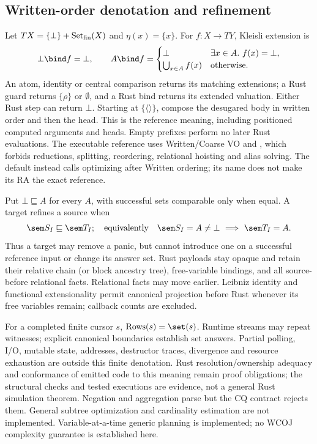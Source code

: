 \subsection{Written-order denotation and refinement}
Let $T X=\{\bot\}+\operatorname{Set}_{\rm fin}(X)$ and
$\eta(x)=\{x\}$. For $f:X\to T Y$, Kleisli extension is
\[
 \bot\bind f=\bot,\qquad
 A\bind f=\begin{cases}
 \bot&\exists x\in A.\ f(x)=\bot,\\
 \bigcup_{x\in A}f(x)&\text{otherwise}.
 \end{cases}
\]
An atom, identity or central comparison returns its matching extensions;
a Rust guard returns $\{\rho\}$ or $\emptyset$, and a Rust bind returns its
extended valuation. Either Rust step can return $\bot$. Starting at
$\{\langle\rangle\}$, compose the desugared body in written order and then
the head. This is the reference meaning, including positioned computed
arguments and heads. Empty prefixes perform no later Rust evaluations.
The executable reference uses Written/Coarse VO and
, which forbids reductions, splitting,
reordering, relational hoisting and alias solving. The default
 instead calls optimizing  after Written
ordering; its name does not make its RA the exact reference.

Put $\bot\sqsubseteq A$ for every $A$, with successful sets comparable only
when equal. A target refines a source when
\[
 \sem S_I\sqsubseteq\sem T_I;
 \quad\text{equivalently}\quad
 \sem S_I=A\ne\bot\ \Longrightarrow\ \sem T_I=A.
\]
Thus a target may remove a panic, but cannot introduce one on a successful
reference input or change its answer set. Rust payloads stay opaque and
retain their relative chain (or block ancestry tree), free-variable bindings,
and all source-before relational facts. Relational facts may move earlier.
Leibniz identity and functional extensionality permit canonical projection
before Rust whenever its free variables remain; callback counts are excluded.

For a completed finite cursor $s$, $\operatorname{Rows}(s)=\set(s)$.
Runtime streams may repeat witnesses; explicit canonical boundaries establish
set answers. Partial polling, I/O, mutable state, addresses, destructor traces,
divergence and resource exhaustion are outside this finite denotation.
Rust resolution/ownership adequacy and conformance of emitted code to this
meaning remain proof obligations; the structural checks and tested executions
are evidence, not a general Rust simulation theorem.
Negation and aggregation parse but the CQ contract rejects them. General
subtree optimization and cardinality estimation are not implemented.
Variable-at-a-time generic planning is implemented; no WCOJ complexity guarantee
is established here.
